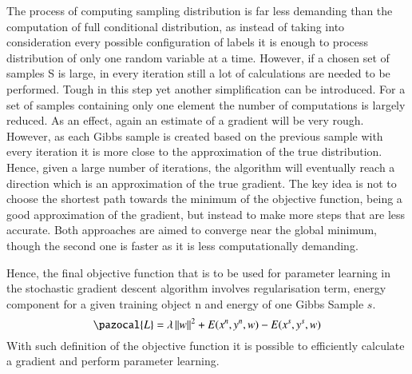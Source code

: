 The process of computing sampling distribution is far less demanding than the computation of full conditional distribution, as instead of taking into consideration every possible configuration of labels it is enough to process distribution of only one random variable at a time. However, if a chosen set of samples S is large, in every iteration still a lot of calculations are needed to be performed. Tough in this step yet another simplification can be introduced. For a set of samples containing only one element the number of computations is largely reduced. As an effect, again an estimate of a gradient will be very rough. However, as each Gibbs sample is created based on the previous sample with every iteration it is more close to the approximation of the true distribution. Hence, given a large number of iterations, the algorithm will eventually reach a direction which is an approximation of the true gradient. The key idea is not to choose the shortest path towards the minimum of the objective function, being a good approximation of the gradient, but instead to make more steps that are less accurate. Both approaches are aimed to converge near the global minimum, though the second one is faster as it is less computationally demanding. 

Hence, the final objective function that is to be used for parameter learning in the stochastic gradient descent algorithm involves regularisation term, energy component for a given training object n and energy of one Gibbs Sample $s$.
\begin{equation}
    \pazocal{L} = \lambda \left \| w \right \|^2 + E(x^n,y^n,w) -E(x^s,y^s,w)
\end{equation}
With such definition of the objective function it is possible to efficiently calculate a gradient and perform parameter learning. 
